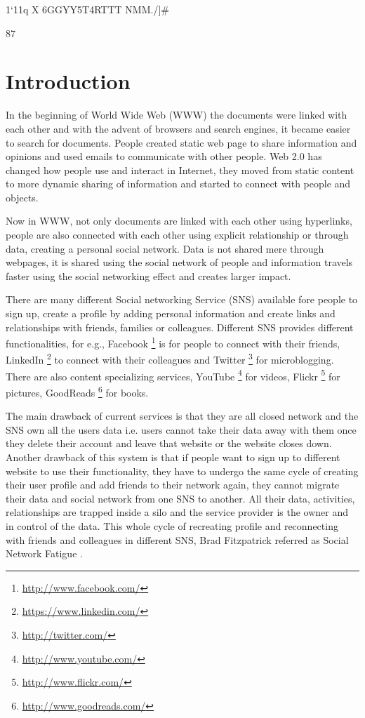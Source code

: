 																																																1`11q	 X 6GGYY5T4RTTT NMM./]#
 																																																
 																																																87%


\chapter{Introduction} \label{Chapter:Introduction}

In the beginning of World Wide Web (WWW) the documents were linked with each other and with the advent of browsers and search engines, it became easier to search for documents. People created static web page to share information and opinions and used emails to communicate with other people. Web 2.0 has changed how people use and interact in Internet, they moved from static content to more dynamic sharing of information and started to connect with people and objects.

Now in WWW, not only documents are linked with each other using hyperlinks, people are also connected with each other using explicit relationship or through data, creating a personal social network. Data is not shared mere through webpages, it is shared using the social network of people and information travels faster using the social networking effect and creates larger impact.

There are many different Social networking Service (SNS) available fore people to sign up, create a profile by adding personal information and create links and relationships with friends, families or colleagues. Different SNS provides different functionalities, for e.g., Facebook  \footnote{\url{http://www.facebook.com/}}  is for people to connect with their friends, LinkedIn \footnote{\url{https://www.linkedin.com/}} to connect with their colleagues and Twitter  \footnote{\url{http://twitter.com/}} for microblogging. There are also content specializing services, YouTube \footnote{\url{http://www.youtube.com/}} for videos, Flickr \footnote{\url{http://www.flickr.com/}} for pictures, GoodReads \footnote{\url{http://www.goodreads.com/}} for books.

The main drawback of current services is that they are all closed network and the SNS own all the users data i.e. users cannot take their data away with them once they delete their account and leave that website or the website closes down. Another drawback of this system is that if people want to sign up to different website to use their functionality, they have to undergo the same cycle of creating their user profile and add friends to their network again, they cannot migrate their data and social network from one SNS to another. All their data, activities, relationships are trapped inside a silo and the service provider is the owner and in control of the data. This whole cycle of recreating profile and reconnecting with friends and colleagues in different SNS, Brad Fitzpatrick referred as Social Network Fatigue \cite{fitzpatrick2007}.

